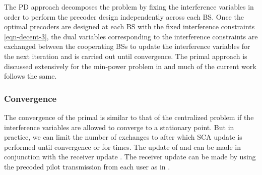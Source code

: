
The \acl{PD} approach decomposes the problem by fixing the interference variables  in order to perform the precoder design independently across each \ac{BS}. Once the optimal precoders are designed at each \ac{BS} with the fixed interference constraints \eqref{eqn-decent-3}, the dual variables corresponding to the interference constraints are exchanged between the cooperating \acp{BS}  to update the interference variables  for the next iteration and is carried out until convergence. The primal approach is discussed extensively for the min-power problem in \cite{pennanen2011decentralized} and much of the current work follows the same. 

\subsubsection*{Convergence}
The convergence of the primal is similar to that of the centralized problem if the interference variables  are allowed to converge to a stationary point. But in practice, we can limit the number of exchanges to  after which \ac{SCA} update is performed until convergence or for  times. The update of  and  can be made in conjunction with the receiver update . The receiver update can be made by using the precoded pilot transmission from each user as in \cite{komulainen2013effective}. 